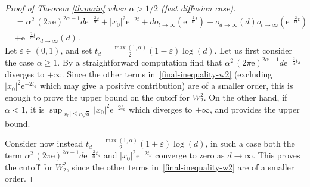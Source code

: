 \documentclass[10pt,reqno]{amsart}
\numberwithin{equation}{section}
\begin{document}
\begin{proof}[Proof of Theorem \ref{th:main} when $\alpha>1/2$ (fast diffusion case)]
\begin{equation}
\begin{split}
&=\alpha^2\,(2\pi\mathrm{e})^{2\alpha-1}d  \mathrm{e}^{-\frac{2}{\alpha}t} + |x_0|^2\mathrm{e}^{-2t} + do_{t\rightarrow\infty}(\mathrm{e}^{-\frac{2}{\alpha}t}) + o_{d\rightarrow\infty}(d)o_{t\rightarrow\infty}(\mathrm{e}^{-\frac{2}{\alpha}t}) \\ 
& + \mathrm{e}^{-\frac{2}{\alpha}t}o_{d\to\infty}(d)\,.
    \end{split}
\end{equation}
Let $\varepsilon\in(0,1)$, and set $t_d=\frac{\max(1,\alpha)}{2}(1-\varepsilon)\log(d)$. 
Let us first consider the case $\alpha \geq 1$. By a straightforward computation find that  $\alpha^2\,(2\pi\mathrm{e})^{2\alpha-1}d  \mathrm{e}^{-\frac{2}{\alpha}t_d}$ diverges to $+\infty$. Since the other terms in~\eqref{final-inequality-w2} (excluding $|x_0|^2 \mathrm{e}^{-2t_d}$ which may give a positive contribution) are of a smaller order, this is enough to prove the upper bound on the cutoff for $W_2^2$. 
On the other hand, if $\alpha < 1$, it is  $\sup_{|x_0| \leq r\sqrt{d}} |x_0|^2 \mathrm{e}^{-2t_d}$ which diverges to $+\infty$, and provides the upper bound. 

Consider now instead $t_d=\frac{\max(1,\alpha)}{2}(1+\varepsilon)\log(d)$, in such a case both the term $\alpha^2\,(2\pi\mathrm{e})^{2\alpha-1}d  \mathrm{e}^{-\frac{2}{\alpha}t_d}$ and $|x_0|^2 \mathrm{e}^{-2t_d}$ converge to zero as $d\rightarrow\infty$. This proves the cutoff for $W_2^2$, since the other terms in~\eqref{final-inequality-w2} are of a smaller order.


\end{proof}
\end{document}
